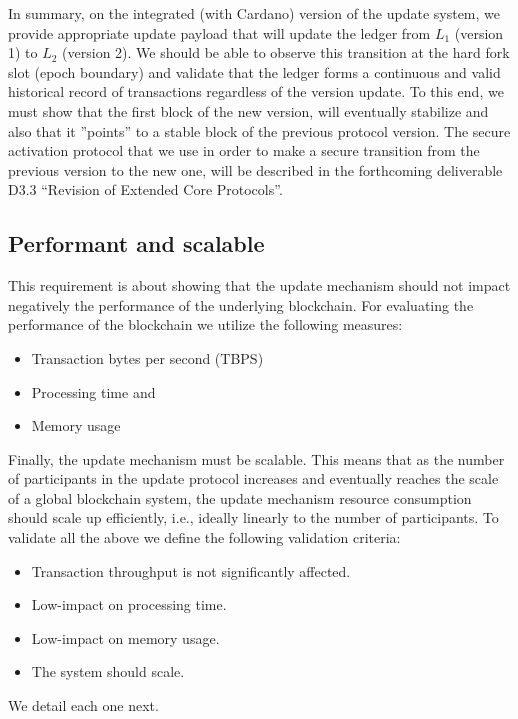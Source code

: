 In summary, on the integrated (with Cardano) version of the
update system, we provide appropriate update payload that will update the
ledger from $L_1$ (version 1) to $L_2$ (version 2). We should be able to 
observe this
transition at the hard fork slot (epoch boundary) and validate that the ledger
forms a continuous and valid historical record of transactions regardless of
the version update. To this end, we must show that the first block of
the new version, will eventually stabilize and also that it ''points'' to a
stable block of the previous protocol version. The secure activation protocol 
that we use in order to make a secure transition from the previous version to 
the new one, will be described in the forthcoming deliverable D3.3 ``Revision 
of Extended Core Protocols''.

\subsection{Performant and scalable}\label{sec:perf_scalable}
This requirement is about showing that the update mechanism should not
impact negatively the performance of the underlying blockchain. For evaluating
the performance of the blockchain we utilize the following measures:
\begin{itemize}
	\item Transaction bytes per second (TBPS)
	\item Processing time and
	\item Memory usage
\end{itemize}
Finally, the update mechanism must be scalable. This means that as the number
of participants in the update protocol increases and eventually reaches the
scale of a global blockchain system, the update mechanism resource consumption
should scale up efficiently, i.e., ideally linearly to the number of
participants.
To validate all the above we define the following validation criteria:
\begin{itemize}
	\item Transaction throughput is not significantly affected.
	\item Low-impact on processing time.
	\item Low-impact on memory usage.
	\item The system should scale.
\end{itemize}

We detail each one next.

